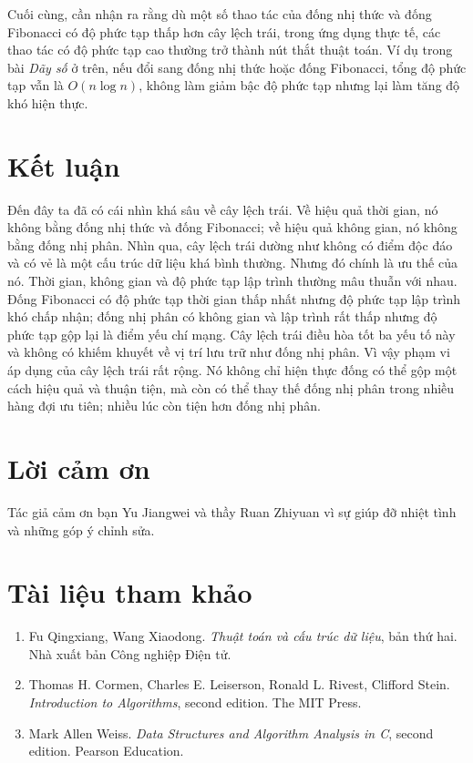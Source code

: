 \documentclass[11pt]{article}
\begin{document}
Cuối cùng, cần nhận ra rằng dù một số thao tác của đống nhị thức và đống
Fibonacci có độ phức tạp thấp hơn cây lệch trái, trong ứng dụng thực tế, các
thao tác có độ phức tạp cao thường trở thành nút thắt thuật toán. Ví dụ trong
bài \emph{Dãy số} ở trên, nếu đổi sang đống nhị thức hoặc đống Fibonacci, tổng
độ phức tạp vẫn là \(O(n\log n)\), không làm giảm bậc độ phức tạp nhưng lại làm
tăng độ khó hiện thực.

\section{Kết luận}

Đến đây ta đã có cái nhìn khá sâu về cây lệch trái. Về hiệu quả thời gian, nó
không bằng đống nhị thức và đống Fibonacci; về hiệu quả không gian, nó không
bằng đống nhị phân. Nhìn qua, cây lệch trái dường như không có điểm độc đáo và
có vẻ là một cấu trúc dữ liệu khá bình thường. Nhưng đó chính là ưu thế của nó.
Thời gian, không gian và độ phức tạp lập trình thường mâu thuẫn với nhau. Đống
Fibonacci có độ phức tạp thời gian thấp nhất nhưng độ phức tạp lập trình khó
chấp nhận; đống nhị phân có không gian và lập trình rất thấp nhưng độ phức tạp
gộp lại là điểm yếu chí mạng. Cây lệch trái điều hòa tốt ba yếu tố này và không
có khiếm khuyết về vị trí lưu trữ như đống nhị phân. Vì vậy phạm vi áp dụng của
cây lệch trái rất rộng. Nó không chỉ hiện thực đống có thể gộp một cách hiệu quả
và thuận tiện, mà còn có thể thay thế đống nhị phân trong nhiều hàng đợi ưu
tiên; nhiều lúc còn tiện hơn đống nhị phân.

\section*{Lời cảm ơn}

Tác giả cảm ơn bạn Yu Jiangwei và thầy Ruan Zhiyuan vì sự giúp đỡ nhiệt tình và
những góp ý chỉnh sửa.

\section*{Tài liệu tham khảo}

\begin{enumerate}
  \item Fu Qingxiang, Wang Xiaodong. \emph{Thuật toán và cấu trúc dữ liệu}, bản
  thứ hai. Nhà xuất bản Công nghiệp Điện tử.
  \item Thomas H. Cormen, Charles E. Leiserson, Ronald L. Rivest, Clifford Stein.
  \emph{Introduction to Algorithms}, second edition. The MIT Press.
  \item Mark Allen Weiss. \emph{Data Structures and Algorithm Analysis in C},
  second edition. Pearson Education.
\end{enumerate}
\end{document}

